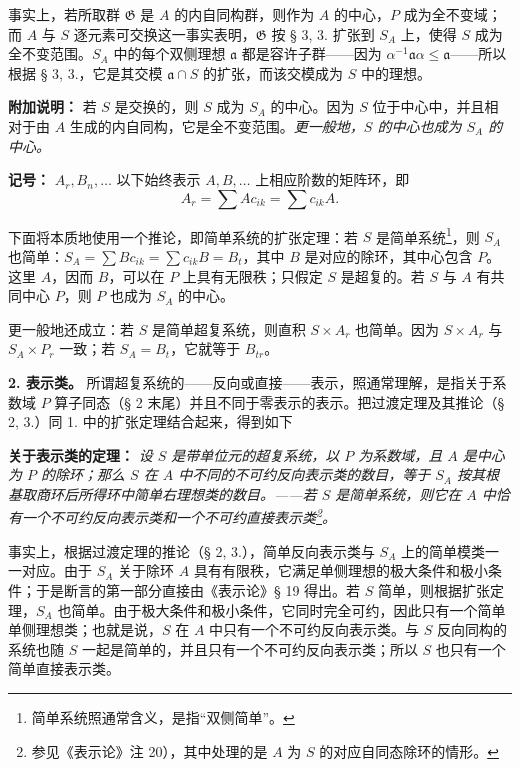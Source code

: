 \documentclass[11pt]{article}
\providecommand{\glqq}{“}
\providecommand{\grqq}{”}
\providecommand{\frG}{\mathfrak G}
\begin{document}
事实上，若所取群 \(\frG\) 是 \(A\) 的内自同构群，则作为 \(A\) 的中心，\(P\) 成为全不变域；而 \(A\) 与 \(S\) 逐元素可交换这一事实表明，\(\frG\) 按 § 3, 3. 扩张到 \(S_A\) 上，使得 \(S\) 成为全不变范围。\(S_A\) 中的每个双侧理想 \(\mathfrak a\) 都是容许子群——因为 \(\alpha^{-1}\mathfrak a\alpha\leq\mathfrak a\)——所以根据 § 3, 3.，它是其交模 \(\mathfrak a\cap S\) 的扩张，而该交模成为 \(S\) 中的理想。

\noindent\textbf{附加说明：} 若 \(S\) 是交换的，则 \(S\) 成为 \(S_A\) 的中心。因为 \(S\) 位于中心中，并且相对于由 \(A\) 生成的内自同构，它是全不变范围。\emph{更一般地，\(S\) 的中心也成为 \(S_A\) 的中心。}

\noindent\textbf{记号：} \(A_r,B_n,\ldots\) 以下始终表示 \(A,B,\ldots\) 上相应阶数的矩阵环，即
\[
        A_r=\sum A c_{ik}=\sum c_{ik}A.
\]

下面将本质地使用一个推论，即简单系统的扩张定理：若 \(S\) 是简单系统\footnote{简单系统照通常含义，是指\glqq{}双侧简单\grqq{}。}，则 \(S_A\) 也简单：\(S_A=\sum B c_{ik}=\sum c_{ik}B=B_t\)，其中 \(B\) 是对应的除环，其中心包含 \(P\)。这里 \(A\)，因而 \(B\)，可以在 \(P\) 上具有无限秩；只假定 \(S\) 是超复的。若 \(S\) 与 \(A\) 有共同中心 \(P\)，则 \(P\) 也成为 \(S_A\) 的中心。

更一般地还成立：若 \(S\) 是简单超复系统，则直积 \(S\times A_r\) 也简单。因为 \(S\times A_r\) 与 \(S_A\times P_r\) 一致；若 \(S_A=B_t\)，它就等于 \(B_{tr}\)。

\noindent\textbf{2. 表示类。} 所谓超复系统的——反向或直接——表示，照通常理解，是指关于系数域 \(P\) 算子同态（§ 2 末尾）并且不同于零表示的表示。把过渡定理及其推论（§ 2, 3.）同 1. 中的扩张定理结合起来，得到如下

\noindent\textbf{关于表示类的定理：} \emph{设 \(S\) 是带单位元的超复系统，以 \(P\) 为系数域，且 \(A\) 是中心为 \(P\) 的除环；那么 \(S\) 在 \(A\) 中不同的不可约反向表示类的数目，等于 \(S_A\) 按其根基取商环后所得环中简单右理想类的数目。——若 \(S\) 是简单系统，则它在 \(A\) 中恰有一个不可约反向表示类和一个不可约直接表示类\footnote{\normalfont 参见《表示论》注 20），其中处理的是 \(A\) 为 \(S\) 的对应自同态除环的情形。}。}

事实上，根据过渡定理的推论（§ 2, 3.），简单反向表示类与 \(S_A\) 上的简单模类一一对应。由于 \(S_A\) 关于除环 \(A\) 具有有限秩，它满足单侧理想的极大条件和极小条件；于是断言的第一部分直接由《表示论》§ 19 得出。若 \(S\) 简单，则根据扩张定理，\(S_A\) 也简单。由于极大条件和极小条件，它同时完全可约，因此只有一个简单单侧理想类；也就是说，\(S\) 在 \(A\) 中只有一个不可约反向表示类。与 \(S\) 反向同构的系统也随 \(S\) 一起是简单的，并且只有一个不可约反向表示类；所以 \(S\) 也只有一个简单直接表示类。
\end{document}
